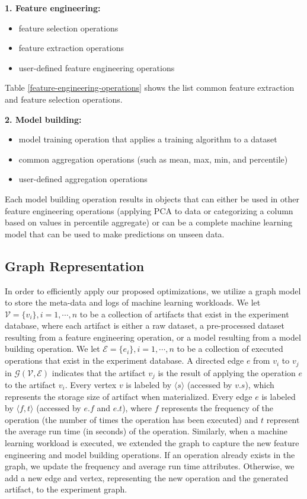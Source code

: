 \textbf{1. Feature engineering:}
\begin{itemize}
\item feature selection operations
\item feature extraction operations
\item user-defined feature engineering operations
\end{itemize}

Table \ref{feature-engineering-operations} shows the list common feature extraction and feature selection operations.

\textbf{2. Model building: }
\begin{itemize}
\item model training operation that applies a training algorithm to a dataset
\item common aggregation operations (such as mean, max, min, and percentile)
\item user-defined aggregation operations 
\end{itemize}
Each model building operation results in objects that can either be used in other feature engineering operations (applying PCA to data or categorizing a column based on values in percentile aggregate) or can be a complete machine learning model that can be used to make predictions on unseen data.

\subsection{Graph Representation}\label{sub-graph-construction}
In order to efficiently apply our proposed optimizations, we utilize a graph model to store the meta-data and logs of machine learning workloads.
We let $\mathcal{V}=\{v_i\}, i = 1, \cdots, n$ to be a collection of artifacts that exist in the experiment database, where each artifact is either a raw dataset, a pre-processed dataset resulting from a feature engineering operation, or a model resulting from a model building operation.
We let $\mathcal{E}=\{e_i\}, i = 1, \cdots, n$ to be a collection of executed operations that exist in the experiment database.
A directed edge $e$ from $v_i$ to $v_j$ in $\mathcal{G}(\mathcal{V},\mathcal{E})$ indicates that the artifact $v_j$ is the result of applying the operation $e$ to the artifact $v_i$.
Every vertex $v$ is labeled by $\langle s \rangle$ (accessed by $v.s$), which represents the storage size of artifact when materialized.
Every edge $e$ is labeled by $\langle f, t\rangle$ (accessed by $e.f$ and $e.t$), where $f$ represents the frequency of the operation (the number of times the operation has been executed) and $t$ represent the average run time (in seconds) of the operation.
Similarly, when a machine learning workload is executed, we extended the graph to capture the new feature engineering and model building operations.
If an operation already exists in the graph, we update the frequency and average run time attributes.
Otherwise, we add a new edge and vertex, representing the new operation and the generated artifact, to the experiment graph.


